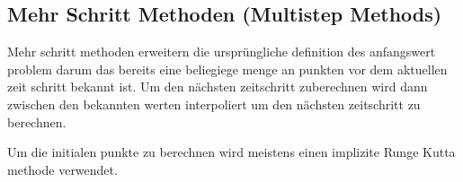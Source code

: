 \subsection{Mehr Schritt Methoden (Multistep Methods)}

Mehr schritt methoden erweitern die ursprüngliche definition des anfangswert problem darum 
das bereits eine beliegiege menge an punkten 
vor dem aktuellen zeit schritt bekannt ist.
Um den nächsten zeitschritt zuberechnen wird dann 
zwischen den bekannten werten interpoliert um den 
nächsten zeitschritt zu berechnen.

Um die initialen punkte zu berechnen wird meistens 
einen implizite Runge Kutta methode verwendet.









